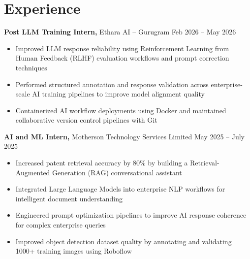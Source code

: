 \section*{Experience}
\textbf{Post LLM Training Intern,} Ethara AI -- Gurugram \hfill Feb 2026 -- May 2026 \\
\vspace{-9pt}
\begin{itemize}
 \item Improved LLM response reliability using Reinforcement Learning from Human Feedback (RLHF) evaluation workflows and prompt correction techniques
 \item Performed structured annotation and response validation across enterprise-scale AI training pipelines to improve model alignment quality
 \item Containerized AI workflow deployments using Docker and maintained collaborative version control pipelines with Git
\end{itemize}

\textbf{AI and ML Intern,} Motherson Technology Services Limited \hfill May 2025 -- July 2025 \\
\vspace{-9pt}
\begin{itemize}
 \item Increased patent retrieval accuracy by 80\% by building a Retrieval-Augmented Generation (RAG) conversational assistant
 \item Integrated Large Language Models into enterprise NLP workflows for intelligent document understanding
 \item Engineered prompt optimization pipelines to improve AI response coherence for complex enterprise queries
 \item Improved object detection dataset quality by annotating and validating 1000+ training images using Roboflow
\end{itemize}

\vspace{-18.5pt}